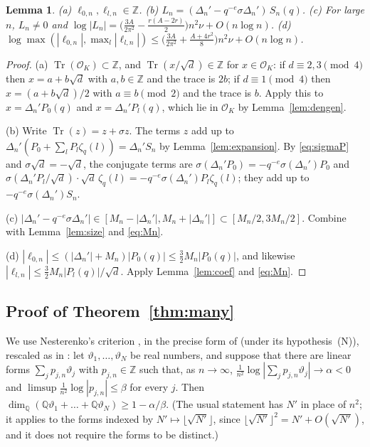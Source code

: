 \documentclass[11pt]{amsart}
\newtheorem{lemma}[theorem]{Lemma}
\theoremstyle{definition}
\theoremstyle{remark}
\numberwithin{equation}{section}
\newcommand{\ZZ}{\mathbb{Z}}
\newcommand{\QQ}{\mathbb{Q}}
\newcommand{\cO}{\mathcal{O}}
\begin{document}
\begin{lemma}\label{lem:trace}
\textup{(a)} $\ell_{0,n},\ell_{l,n}\in\ZZ$.
\textup{(b)} $L_n=(\Delta_n'-q^{-e}\sigma\Delta_n')\,S_n(q)$.
\textup{(c)} For large $n$, $L_n\ne0$ and $\log|L_n|=\bigl(\frac{3A}{2\pi^2}-\frac{r(A-2r)}2\bigr)n^2\nu+O(n\log n)$.
\textup{(d)} $\log\max(|\ell_{0,n}|,\max_l|\ell_{l,n}|)\le\bigl(\frac{3A}{2\pi^2}+\frac{A+4r^2}8\bigr)n^2\nu+
O(n\log n)$.
\end{lemma}

\begin{proof}
(a) $\operatorname{Tr}(\cO_K)\subset\ZZ$, and $\operatorname{Tr}(x/\sqrt d)\in\ZZ$ for $x\in\cO_K$: if
$d\equiv2,3\pmod4$ then $x=a+b\sqrt d$ with $a,b\in\ZZ$ and the trace is $2b$; if $d\equiv1\pmod4$ then
$x=(a+b\sqrt d)/2$ with $a\equiv b\pmod 2$ and the trace is $b$. Apply this to $x=\Delta_n'P_0(q)$ and
$x=\Delta_n'P_l(q)$, which lie in $\cO_K$ by Lemma~\ref{lem:dengen}.

(b) Write $\operatorname{Tr}(z)=z+\sigma z$. The terms $z$ add up to $\Delta_n'(P_0+\sum_lP_l\zeta_q(l))=
\Delta_n'S_n$ by Lemma~\ref{lem:expansion}. By \eqref{eq:sigmaP} and $\sigma\sqrt d=-\sqrt d$, the conjugate terms are
$\sigma(\Delta_n'P_0)=-q^{-e}\sigma(\Delta_n')P_0$ and $\sigma(\Delta_n'P_l/\sqrt d)\cdot\sqrt d\,\zeta_q(l)=
-q^{-e}\sigma(\Delta_n')P_l\zeta_q(l)$; they add up to $-q^{-e}\sigma(\Delta_n')S_n$.

(c) $|\Delta_n'-q^{-e}\sigma\Delta_n'|\in[M_n-|\Delta_n'|,M_n+|\Delta_n'|]\subset[M_n/2,3M_n/2]$. Combine with
Lemma~\ref{lem:size} and \eqref{eq:Mn}.

(d) $|\ell_{0,n}|\le(|\Delta_n'|+M_n)|P_0(q)|\le\frac32M_n|P_0(q)|$, and likewise $|\ell_{l,n}|\le\frac32M_n|P_l(q)|/
\sqrt d$. Apply Lemma~\ref{lem:coef} and \eqref{eq:Mn}.
\end{proof}

\subsection*{Proof of Theorem~\ref{thm:many}}
We use Nesterenko's criterion \cite{Nes85}, in the precise form of \cite[Theorem~A]{FZ10} (under its
hypothesis~(N)), rescaled as in \cite[Proposition~2]{KRZ06}: let $\vartheta_1,\dots,
\vartheta_N$ be real numbers, and suppose that there are linear forms $\sum_jp_{j,n}\vartheta_j$ with
$p_{j,n}\in\ZZ$ such that, as $n\to\infty$, $\frac1{n^2}\log|\sum_jp_{j,n}\vartheta_j|\to\alpha<0$ and
$\limsup\frac1{n^2}\log|p_{j,n}|\le\beta$ for every $j$. Then $\dim_\QQ(\QQ\vartheta_1+\dots+\QQ\vartheta_N)\ge
1-\alpha/\beta$. (The usual statement has $N'$ in place of $n^2$; it applies to the forms indexed by
$N'\mapsto\lfloor\sqrt{N'}\rfloor$, since $\lfloor\sqrt{N'}\rfloor^2=N'+O(\sqrt{N'})$, and it does not require the
forms to be distinct.)
\end{document}
